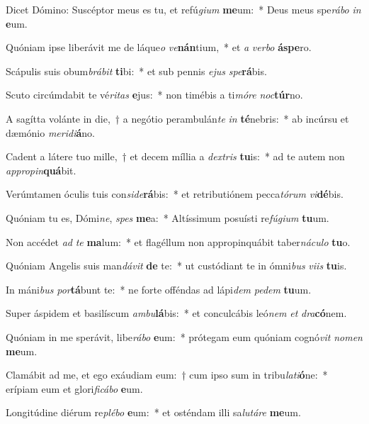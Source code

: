\item Dicet Dómino: Suscéptor meus es tu, et refú\textit{gi}\textit{um} \textbf{me}um:~* Deus meus spe\textit{rá}\textit{bo} \textit{in} \textbf{e}um.
\item Quóniam ipse liberávit me de láque\textit{o} \textit{ve}\textbf{nán}tium,~* et \textit{a} \textit{ver}\textit{bo} \textbf{ás}\textbf{pe}ro.
\item Scápulis suis obum\textit{brá}\textit{bit} \textbf{ti}bi:~* et sub pennis \textit{e}\textit{jus} \textit{spe}\textbf{rá}bis.
\item Scuto circúmdabit te vé\textit{ri}\textit{tas} \textbf{e}jus:~* non timébis a ti\textit{mó}\textit{re} \textit{noc}\textbf{túr}no.
\item A sagítta volánte in die,~† a negótio perambulán\textit{te} \textit{in} \textbf{té}nebris:~* ab incúrsu et dæmónio \textit{me}\textit{ri}\textit{di}\textbf{á}no.
\item Cadent a látere tuo mille,~† et decem míllia a \textit{dex}\textit{tris} \textbf{tu}is:~* ad te autem non \textit{ap}\textit{pro}\textit{pin}\textbf{quá}bit.
\item Verúmtamen óculis tuis con\textit{si}\textit{de}\textbf{rá}bis:~* et retributiónem pecca\textit{tó}\textit{rum} \textit{vi}\textbf{dé}bis.
\item Quóniam tu es, Dómi\textit{ne}, \textit{spes} \textbf{me}a:~* Altíssimum posuísti re\textit{fú}\textit{gi}\textit{um} \textbf{tu}um.
\item Non accédet \textit{ad} \textit{te} \textbf{ma}lum:~* et flagéllum non appropinquábit taber\textit{ná}\textit{cu}\textit{lo} \textbf{tu}o.
\item Quóniam Angelis suis man\textit{dá}\textit{vit} \textbf{de} te:~* ut custódiant te in ómni\textit{bus} \textit{vi}\textit{is} \textbf{tu}is.
\item In máni\textit{bus} \textit{por}\textbf{tá}bunt te:~* ne forte offéndas ad lápi\textit{dem} \textit{pe}\textit{dem} \textbf{tu}um.
\item Super áspidem et basilíscum \textit{am}\textit{bu}\textbf{lá}bis:~* et conculcábis leó\textit{nem} \textit{et} \textit{dra}\textbf{có}nem.
\item Quóniam in me sperávit, libe\textit{rá}\textit{bo} \textbf{e}um:~* prótegam eum quóniam cognó\textit{vit} \textit{no}\textit{men} \textbf{me}um.
\item Clamábit ad me, et ego exáudiam eum:~† cum ipso sum in tribu\textit{la}\textit{ti}\textbf{ó}ne:~* erípiam eum et glori\textit{fi}\textit{cá}\textit{bo} \textbf{e}um.
\item Longitúdine diérum re\textit{plé}\textit{bo} \textbf{e}um:~* et osténdam illi sa\textit{lu}\textit{tá}\textit{re} \textbf{me}um.
